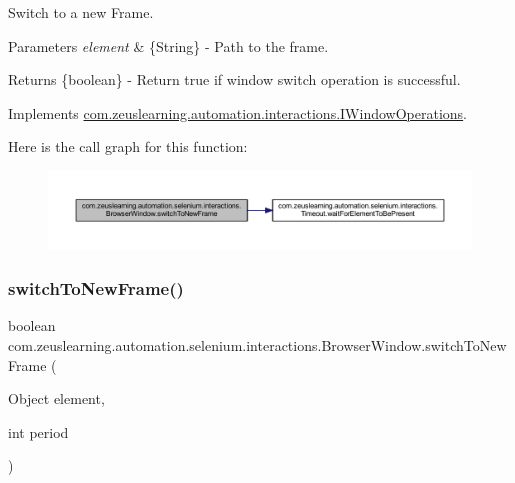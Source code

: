 Switch to a new Frame.


\begin{DoxyParams}{Parameters}
{\em element} & \{String\} -\/ Path to the frame. \\
\hline
\end{DoxyParams}
\begin{DoxyReturn}{Returns}
\{boolean\} -\/ Return {\ttfamily true} if window switch operation is successful. 
\end{DoxyReturn}


Implements \hyperlink{interfacecom_1_1zeuslearning_1_1automation_1_1interactions_1_1IWindowOperations_a9d922d36597fad9aa9e9eb79fb334efe}{com.\+zeuslearning.\+automation.\+interactions.\+I\+Window\+Operations}.

Here is the call graph for this function\+:
\nopagebreak
\begin{figure}[H]
\begin{center}
\leavevmode
\includegraphics[width=350pt]{d8/d87/classcom_1_1zeuslearning_1_1automation_1_1selenium_1_1interactions_1_1BrowserWindow_ae6c8f6ecf277ac9da4d262eff3147403_cgraph}
\end{center}
\end{figure}
\hypertarget{classcom_1_1zeuslearning_1_1automation_1_1selenium_1_1interactions_1_1BrowserWindow_ad9874267c9a73f226dc6a7863ae184a2}{}\label{classcom_1_1zeuslearning_1_1automation_1_1selenium_1_1interactions_1_1BrowserWindow_ad9874267c9a73f226dc6a7863ae184a2} 
\subsubsection{\texorpdfstring{switch\+To\+New\+Frame()}{switchToNewFrame()}\hspace{0.1cm}{\footnotesize\ttfamily [2/2]}}
{\footnotesize\ttfamily boolean com.\+zeuslearning.\+automation.\+selenium.\+interactions.\+Browser\+Window.\+switch\+To\+New\+Frame (\begin{DoxyParamCaption}\item[{Object}]{element,  }\item[{int}]{period }\end{DoxyParamCaption})\hspace{0.3cm}{\ttfamily [inline]}}

